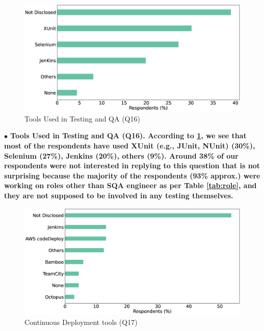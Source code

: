 \begin{figure}[h]
\centering
  \includegraphics[scale=0.18]{Figures/Respondents_testing_tools}
  \caption{Tools Used in Testing and QA (Q16)}
  \label{fig:testingTools}
\end{figure}
\nd\bf{$\bullet$ Tools Used in Testing and QA (Q16).} According to \ref{fig:testingTools}, we see that most of the
respondents have used XUnit (e.g., JUnit, NUnit) (30\%), Selenium (27\%),
Jenkins (20\%), others (9\%). Around
38\% of our respondents were not interested in replying to this question that is
not surprising because the majority of the respondents (93\% approx.) were
working on roles other than SQA engineer as per Table \ref{tab:role}, and they
are not supposed to be involved in any testing themselves. 


\begin{figure}[h]
\centering
  \includegraphics[scale=0.18]{Figures/Respondents_deployment_tools}
  \caption{Continuous Deployment tools (Q17)}
  \label{fig:deployTools}
\end{figure}

